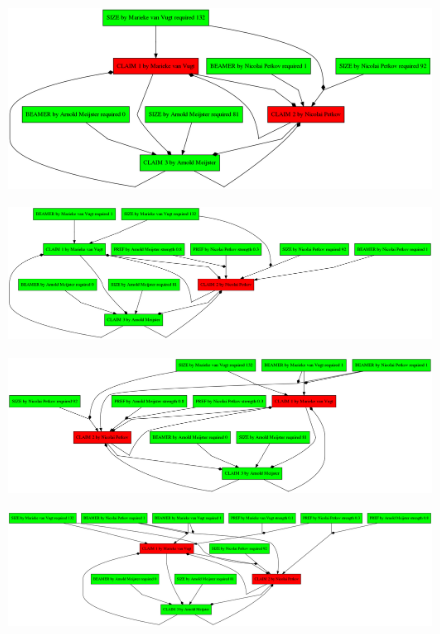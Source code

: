 \documentclass{beamer}
\begin{document}
\begin{frame}[plain]
	\begin{figure}
		\includegraphics[keepaspectratio,width=\textwidth,height=\textheight,]{demo/1}
	\end{figure}
\end{frame}

\begin{frame}[plain]
	\begin{figure}
		\includegraphics[keepaspectratio,width=\textwidth,height=\textheight,]{demo/2}
	\end{figure}
\end{frame}

\begin{frame}[plain]
	\begin{figure}
		\includegraphics[keepaspectratio,width=\textwidth,height=\textheight,]{demo/3}
	\end{figure}
\end{frame}

\begin{frame}[plain]
	\begin{figure}
		\includegraphics[keepaspectratio,width=\textwidth,height=\textheight,]{demo/4}
	\end{figure}
\end{frame}
\end{document}
